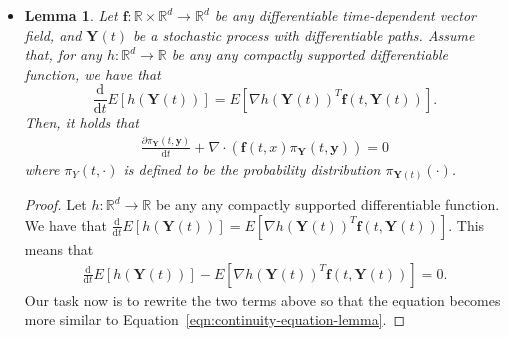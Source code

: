 \documentclass[10pt]{article}
\newtheorem{lemma}{Lemma}
\newcommand{\dee}{\mathrm{d}}
\newcommand{\ve}[1]{\mathbf{#1}}
\newcommand{\Real}{\mathbb{R}}
\begin{document}
\begin{itemize}
  \item \begin{lemma} \label{thm:continuity-equation}
    Let $\ve{f}: \Real \times \Real^d \rightarrow \Real^d$ be any differentiable time-dependent vector field, and $\ve{Y}(t)$ be a stochastic process with differentiable paths. Assume that, for any $h: \Real^d \rightarrow \Real$ be any any compactly supported differentiable function, we have that $$\frac{\dee}{\dee t} E[h(\ve{Y}(t))] = E[\nabla h(\ve{Y}(t))^T \ve{f}(t, \ve{Y}(t))].$$ Then, it holds that 
    \begin{align} 
      \frac{\partial \pi_\ve{Y}(t, \ve{y})}{\dee t} + \nabla \cdot (\ve{f}(t, x) \pi_{\ve{Y}}(t, \ve{y})) = 0 \label{eqn:continuity-equation-lemma}
    \end{align} 
    where $\pi_{Y}(t, \cdot)$ is defined to be the probability distribution $\pi_{\ve{Y}(t)}(\cdot)$.    
  \end{lemma}

  \begin{proof}
    Let $h: \Real^d \rightarrow \Real$ be any any compactly supported differentiable function. We have that $\frac{\dee}{\dee t} E[h(\ve{Y}(t))] = E[\nabla h(\ve{Y}(t))^T \ve{f}(t, \ve{Y}(t))].$ This means that
    \begin{align*}
      \frac{\dee}{\dee t} E[h(\ve{Y}(t))] - E[\nabla h(\ve{Y}(t))^T \ve{f}(t, \ve{Y}(t))] = 0.
    \end{align*}
    Our task now is to rewrite the two terms above so that the equation becomes more similar to Equation~\ref{eqn:continuity-equation-lemma}.


\end{proof}
\end{itemize}
\end{document}
